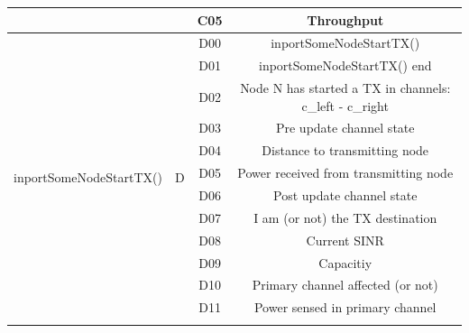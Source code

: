 \documentclass[a4paper]{article}
\begin{document}
\begin{table}[h!]
\begin{tabular}{|c|c|c|c|}
		                                           &                     & C05               & Throughput                                              \\ \hline
		\multirow{14}{*}{inportSomeNodeStartTX()}  & \multirow{14}{*}{D} & D00               & inportSomeNodeStartTX()                                 \\ \cline{3-4} 
		                                           &                     & D01               & inportSomeNodeStartTX() end                             \\ \cline{3-4} 
		                                           &                     & D02               & Node N has started a TX in channels: c\_left - c\_right \\ \cline{3-4} 
		                                           &                     & D03               & Pre update channel state                                \\ \cline{3-4} 
		                                           &                     & D04               & Distance to transmitting node                           \\ \cline{3-4} 
		                                           &                     & D05               & Power received from transmitting node                   \\ \cline{3-4} 
		                                           &                     & D06               & Post update channel state                               \\ \cline{3-4} 
		                                           &                     & D07               & I am (or not) the TX destination                        \\ \cline{3-4} 
		                                           &                     & D08               & Current SINR                                            \\ \cline{3-4} 
		                                           &                     & D09               & Capacitiy                                               \\ \cline{3-4} 
		                                           &                     & D10               & Primary channel affected (or not)                       \\ \cline{3-4} 
		                                           &                     & D11               & Power sensed in primary channel                         \\ \cline{3-4} 

\end{tabular}
\end{table}
\end{document}
